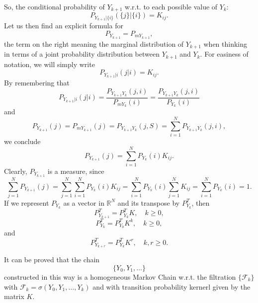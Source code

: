 So, the conditional probability of $Y_{k+1}$ w.r.t. to each possible value of $Y_k$:
\begin{equation*}
P_{Y_{k+1}|\{i\}}(\{j\}|\{i\})={K}_{ij}.
\end{equation*}
Let us then find an explicit formula for
\begin{equation*}
P_{Y_{k+1}} = P_{mY_{k+1}},
\end{equation*}
the term on the right meaning the marginal distribution of $Y_{k+1}$ when thinking in terms of a joint probability distribution between $Y_{k+1}$ and $Y_k$.
For easiness of notation, we will simply write
\begin{equation*}
P_{Y_{k+1}|i}(j|i)={K}_{ij}.
\end{equation*}
%
By remembering that
\begin{equation*}
P_{Y_{k+1}|i}(j|i) = \frac{P_{Y_{k+1}Y_k}(j,i)}{P_{mY_k}(i)} = \frac{P_{Y_{k+1}Y_k}(j,i)}{P_{Y_k}(i)}
\end{equation*}
and
\begin{equation*}
P_{Y_{k+1}}(j) = P_{mY_{k+1}}(j) = P_{Y_{k+1}Y_k}(j,S) = \sum_{i=1}^{N}P_{Y_{k+1}Y_k}(j,i),
\end{equation*}
we conclude
\begin{equation*}
P_{Y_{k+1}}(j) = \sum_{i=1}^{N}P_{Y_k}(i){K}_{ij}.
\end{equation*}
Clearly, $P_{Y_{k+1}}$ is a measure, since
\begin{equation*}
\sum_{j=1}^{N}P_{Y_{k+1}}(j) = \sum_{j=1}^{N}\sum_{i=1}^{N}P_{Y_k}(i){K}_{ij} = \sum_{i=1}^{N}P_{Y_k}(i)\sum_{j=1}^{N}{K}_{ij} = \sum_{i=1}^{N}P_{Y_k}(i) = 1.
\end{equation*}
If we represent $P_{Y_k}$ as a vector in $\mathbb{R}^N$ and its transpose by $P_{Y_k}^T$, then
\begin{equation}\label{eq-markov-recursive-relation-finite}
P_{Y_{k+1}}^T = P_{Y_k}^TK,\quad k\geqslant 0,
\end{equation}
\begin{equation}\label{eq-markov-Kk}
P_{Y_k}^T = P_{Y_0}^T{K}^k,\quad k\geqslant 0,
\end{equation}
and
\begin{equation}\label{eq-markov-Kr}
P_{Y_{k+r}}^T = P_{Y_k}^T{K}^r,\quad k,r\geqslant 0.
\end{equation}

It can be proved that the chain
\begin{equation*}
\{Y_0,Y_1,\ldots\}
\end{equation*}
constructed in this way is a homogeneous Markov Chain
w.r.t. the filtration $\{\mathcal{F}_k\}$ with $\mathcal{F}_k=\sigma(Y_0,Y_1,\ldots,Y_k)$ and
with transition probability kernerl given by the matrix $K$.

